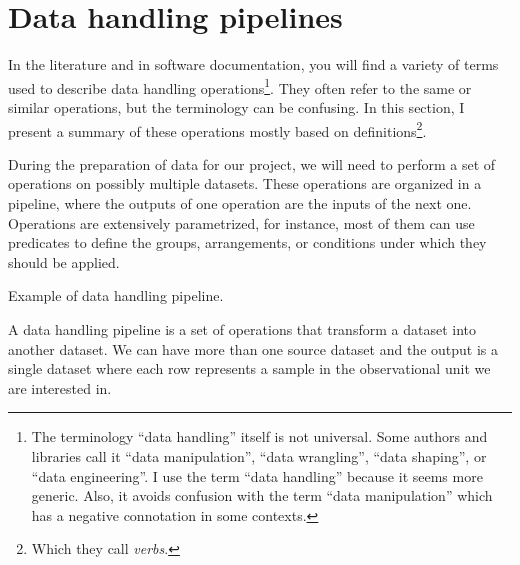 \section{Data handling pipelines}

In the literature and in software documentation, you will find a variety of terms used to
describe data handling operations\footnote{%
  The terminology ``data handling'' itself is not universal.  Some authors and libraries
  call it ``data manipulation'', ``data wrangling'', ``data shaping'', or ``data
  engineering''.  I use the term ``data handling'' because it seems more generic.
  Also, it avoids confusion with the term ``data
  manipulation'' which has a negative connotation in some contexts.}. %
They often refer to the same or similar operations, but the terminology can be confusing.
In this section, I present a summary of these operations mostly based on
\textcite{Wickham2023} definitions\footnote{Which they call \emph{verbs}.}.


During the preparation of data for our project, we will need to perform a set of operations
on possibly multiple datasets.  These operations are organized in a pipeline, where the
outputs of one operation are the inputs of the next one.
Operations are extensively parametrized, for instance, most of them can use predicates to
define the groups, arrangements, or conditions under which they should be applied.

\begin{figurebox}[label=fig:pipeline]{Example of data handling pipeline.}
  \centering
  \tcblower
  A data handling pipeline is a set of operations that transform a dataset into
  another dataset.  We can have more than one source dataset and the output is a single
  dataset where each row represents a sample in the observational unit we are interested
  in.
\end{figurebox}

